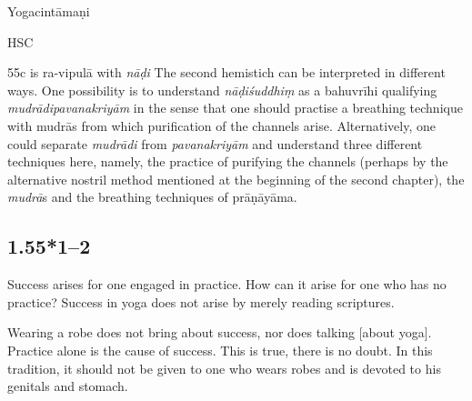\begin{ekdosis}
\begin{sources}[hp01_055]
\end{sources}

\begin{testimonia}[hp01_055]
Yogacintāmaṇi

\begin{versinnote}
\end{versinnote}

HSC

\begin{versinnote}
\end{versinnote}

\end{testimonia}

\begin{philcomm}[hp01_055]
55c is ra-vipulā with \emph{nāḍi}
The second hemistich can be interpreted in different ways. One possibility is to understand \emph{nāḍiśuddhiṃ} as a bahuvrīhi qualifying \emph{mudrādipavanakriyām} in the sense that one should practise a breathing technique with mudrās from which purification of the channels arise. Alternatively, one could separate \emph{mudrādi} from \emph{pavanakriyām} and understand three different techniques here, namely, the practice of purifying the channels (perhaps by the alternative nostril method mentioned at the beginning of the second chapter), the \emph{mudrā}s and the breathing techniques of prāṇāyāma.  
\end{philcomm}

\subsection*{1.55*1--2}
\begin{translation}[hp01_055_1]
Success arises for one engaged in practice. How can it arise for one who has no practice? Success in yoga does not arise by merely reading scriptures.

Wearing a robe does not bring about success, nor does talking [about yoga]. Practice alone is the cause of success. This is true, there is no doubt. In this tradition, it should not be given to one who wears robes and is devoted to his genitals and stomach.
\end{translation}


\end{ekdosis}
